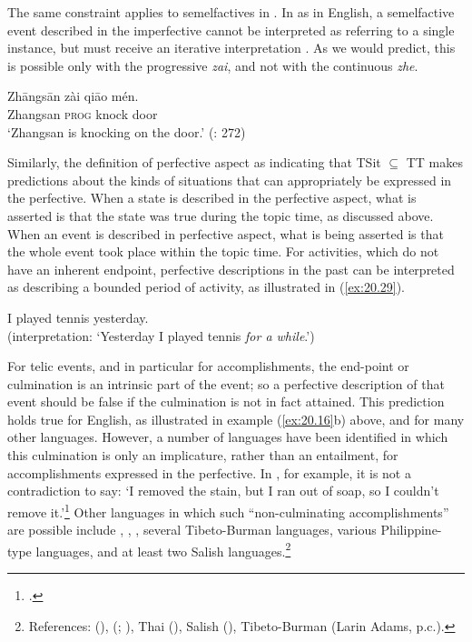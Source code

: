 The same constraint applies to semelfactives in . In  as in English, a semelfactive event described in the imperfective cannot be interpreted as referring to a single instance, but must receive an iterative interpretation . As we would predict, this is possible only with the progressive \textit{zai}, and not with the continuous \textit{zhe}.


\ea \label{ex:20.28}
\gll Zhāngsān  zài  qiāo  mén.\\
Zhangsan  \textsc{prog}  knock  door\\
\glt ‘Zhangsan is knocking on the door.’  (\citealt{Smith1997}: 272)
\z


Similarly, the definition of perfective aspect as indicating that TSit ${\subseteq}$ TT makes predictions about the kinds of situations that can appropriately be expressed in the perfective. When a state is described in the perfective aspect, what is asserted is that the state was true during the topic time, as discussed above. When an event is described in perfective aspect, what is being asserted is that the whole event took place within the topic time. For activities, which do not have an inherent endpoint, perfective descriptions in the past can be interpreted as describing a bounded period of activity, as illustrated in (\ref{ex:20.29}).


\ea \label{ex:20.29}
I played tennis yesterday.\\
(interpretation: ‘Yesterday I played tennis \textit{for a while}.’)
\z


For telic events, and in particular for accomplishments, the end-point or culmination is an intrinsic part of the event; so a perfective description of that event should be false if the culmination is not in fact attained. This prediction holds true for English, as illustrated in example (\ref{ex:20.16}b) above, and for many other languages. However, a number of languages have been identified in which this culmination is only an implicature, rather than an entailment, for accomplishments expressed in the perfective. In , for example, it is not a contradiction to say: ‘I removed the stain, but I ran out of soap, so I couldn’t remove it.’\footnote{\citet[186]{Dell1983}.} Other languages in which such “non-culminating accomplishments” are possible include , , , several Tibeto-Burman languages, various Philippine-type languages, and at least two Salish languages.\footnote{References:  (\citealt{Singh1991,Singh1998}),  (\citealt{SohKuo2005}; \citealt{KoenigChief2008}), Thai (\citealt{KoenigMuansuwan2000}), Salish (\citealt{Bar-elEtAl2005}), Tibeto-Burman (Larin Adams, p.c.).}



